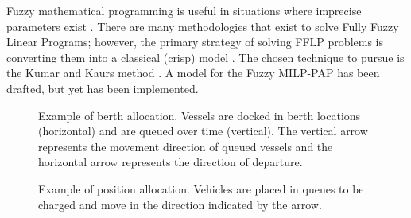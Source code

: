 \documentclass[11pt,a4paper,final]{article}
\begin{document}
Fuzzy mathematical programming is useful in situations where imprecise parameters exist \cite{bello-2019-fuzzy-activ}.
There are many methodologies that exist to solve Fully Fuzzy Linear Programs; however, the primary strategy of solving
FFLP problems is converting them into a classical (crisp) model
\cite{bello-2019-fuzzy-activ,nasseri-2013-fully,kaur-2016-introd-fuzzy}. The chosen technique to pursue is the Kumar
and Kaurs method \cite{kaur-2016-introd-fuzzy}. A model for the Fuzzy MILP-PAP has been drafted, but yet has been
implemented.

\begin{subfigures}
    \begin{figure}[htpb]
    \centering
        
        \caption{Example of berth allocation. Vessels are docked in berth locations (horizontal) and are queued over
          time (vertical). The vertical arrow represents the movement direction of queued vessels and the horizontal
          arrow represents the direction of departure.}
        \label{subfig:bapexample}
    \end{figure}
    \hfill

    \begin{figure}[htpb]
    \centering
        
        \caption{Example of position allocation. Vehicles are placed in queues to be charged and move in the direction
          indicated by the arrow.}
        \label{subfig:papexample}
    \end{figure}
\end{subfigures}



\end{document}
